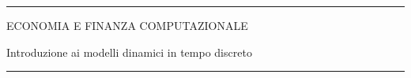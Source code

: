 \documentclass[12pt,aspectratio=169]{beamer}
\begin{document}
\begin{frame}
\unitlength 5mm

\begin{center}

\rule{\textwidth}{2pt}

\vskip3mm
ECONOMIA E FINANZA COMPUTAZIONALE

Introduzione ai modelli dinamici in tempo discreto
\rule{\textwidth}{2pt}

\end{center}

\end{frame}


\end{document}
